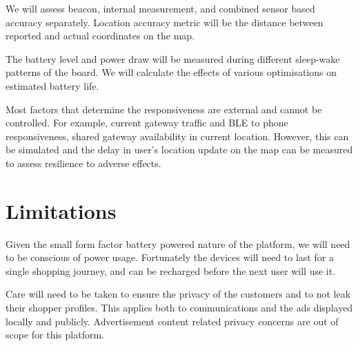 \documentclass[11pt,]{article}
\begin{document}
\begin{description}
\hypertarget{location-accuracy}{%
\item[Location Accuracy]\label{location-accuracy}}
We will assess beacon, internal measurement, and combined sensor based
accuracy separately. Location accuracy metric will be the distance
between reported and actual coordinates on the map.

\hypertarget{power-consumption}{%
\item[Power Consumption]\label{power-consumption}}
The battery level and power draw will be measured during different
sleep-wake patterns of the board. We will calculate the effects of
various optimisations on estimated battery life.

\hypertarget{responsiveness}{%
\item[Responsiveness]\label{responsiveness}}
Most factors that determine the responsiveness are external and cannot
be controlled. For example, current gateway traffic and BLE to phone
responsiveness, shared gateway availability in current location.
However, this can be simulated and the delay in user's location update
on the map can be measured to assess resilience to adverse effects.
\end{description}

\hypertarget{limitations}{%
\section{Limitations}\label{limitations}}

Given the small form factor battery powered nature of the platform, we
will need to be conscious of power usage. Fortunately the devices will
need to last for a single shopping journey, and can be recharged before
the next user will use it.

Care will need to be taken to ensure the privacy of the customers and to
not leak their shopper profiles. This applies both to communications and
the ads displayed locally and publicly. Advertisement content related
privacy concerns are out of scope for this platform.
\end{document}
